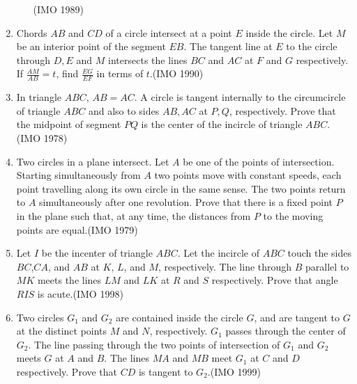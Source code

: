 \begin{enumerate}[label=\thesubsection.\arabic*,ref=\thesubsection.\theenumi]
\begin{enumerate}
	\hfill(IMO  1989)
\end{enumerate}
   \item Chords $AB$ and $CD$ of a circle intersect at a point $E$ inside the circle. Let $M$ be an interior point of the segment $EB$. The tangent line at $E$ to the circle through $D, E$ and $M$ intersects the lines $BC$ and $AC$ at $F$ and $G$ respectively. If $\frac{AM}{AB}=t$,
  find $ \frac{EG}{EF}$  
	  in terms of $t$.\hfill(IMO  1990)
\item In triangle $ABC$, $AB = AC$. A circle is tangent internally to the circumcircle of triangle $ABC$ and also to sides $AB, AC$ at $P, Q$, respectively. Prove that the midpoint of segment $PQ$ is the center of the incircle of triangle $ABC.$\hfill(IMO  1978)
\item Two circles in a plane intersect. Let $A$ be one of the points of intersection. Starting simultaneously from $A$ two points move with constant speeds, each point travelling along its own circle in the same sense. The two points return to $A$ simultaneously after one revolution. Prove that there is a fixed point $P$ in the plane such that, at any time, the distances from $P$ to the moving points are equal.\hfill(IMO  1979) 
\item Let $I$ be the incenter of triangle $ABC$. Let the incircle of $ABC$ touch the sides $BC$,$CA$, and $AB$ at $K$, $L$, and $M$, respectively. The line through $B$ parallel to $MK$ meets the lines $LM$ and $LK$ at $R$ and $S$ respectively. Prove that angle $RIS$ is acute.\hfill(IMO  1998)
%
\item Two circles ${G_{1}}$ and ${G_{2}}$ are contained inside the circle $G$, and are tangent to $G$ at the distinct points $M$ and $N$, respectively. ${G_{1}}$ passes through the center of ${G_{2}}$. The line passing through the two points of intersection of ${G_{1}}$ and ${G_{2}}$ meets $G$ at $A$ and $B$. The lines $MA$ and $MB$ meet ${G_{1}}$ at $C$ and $D$ respectively. Prove that $CD$ is tangent to ${G_{2}}$.\hfill(IMO  1999)
                      	

\end{enumerate}
